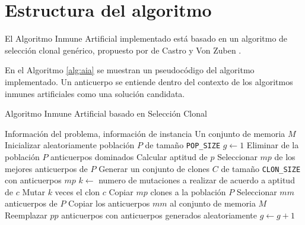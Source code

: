 \section{Estructura del algoritmo}

El Algoritmo Inmune Artificial implementado está basado en un algoritmo de selección clonal genérico, propuesto por de Castro y Von Zuben \cite{read2012introduction}.

En el Algoritmo \ref{alg:aia} se muestran un pseudocódigo del algoritmo implementado. Un anticuerpo se entiende dentro del contexto de los algoritmos inmunes artificiales como una solución candidata. 

\begin{algorithm}
\caption{Algoritmo Inmune Artificial basado en Selección Clonal}\label{alg:aia}
\begin{algorithmic}[1]
\REQUIRE  Información del problema, información de instancia
\ENSURE Un conjunto de memoria $M$
\STATE Inicializar aleatoriamente población $P$ de tamaño \texttt{POP\_SIZE}
\STATE $g \leftarrow 1$
	\STATE Eliminar de la población $P$ anticuerpos dominados
		\STATE Calcular aptitud de $p$
	\ENDFOR
	\STATE Seleccionar $mp$ de los mejores anticuerpos de $P$
	\STATE Generar un conjunto de clones $C$ de tamaño \texttt{CLON\_SIZE} con anticuerpos $mp$
		\STATE $k \leftarrow$ numero de mutaciones a realizar de acuerdo a aptitud de $c$		
		\STATE Mutar $k$ veces el clon $c$
	\ENDFOR
	\STATE Copiar $mp$ clones a la población $P$
	\STATE Seleccionar $mm$ anticuerpos de $P$
	\STATE Copiar los anticuerpos $mm$ al conjunto de memoria $M$
	\STATE Reemplazar $pp$ anticuerpos con anticuerpos generados aleatoriamente
	\STATE $g \leftarrow g+1$
\ENDWHILE
\end{algorithmic}
\end{algorithm}
